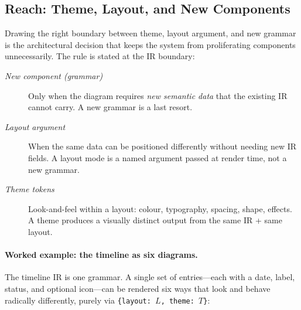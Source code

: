 \subsection{Reach: Theme, Layout, and New Components}
\label{sec:themes-reach}

Drawing the right boundary between theme, layout argument, and new grammar is the
architectural decision that keeps the system from proliferating components unnecessarily.
The rule is stated at the IR boundary:

\begin{description}
  \item[\emph{New component (grammar)}] Only when the diagram requires \emph{new semantic
        data} that the existing IR cannot carry. A new grammar is a last resort.
  \item[\emph{Layout argument}] When the same data can be positioned differently without
        needing new IR fields. A layout mode is a named argument passed at render time,
        not a new grammar.
  \item[\emph{Theme tokens}] Look-and-feel within a layout: colour, typography, spacing,
        shape, effects. A theme produces a visually distinct output from the same IR +
        same layout.
\end{description}

\paragraph{Worked example: the timeline as six diagrams.}

The timeline IR is one grammar. A single set of entries---each with a date, label, status,
and optional icon---can be rendered six ways that look and behave radically differently,
purely via \texttt{\{layout: $L$, theme: $T$\}}:


